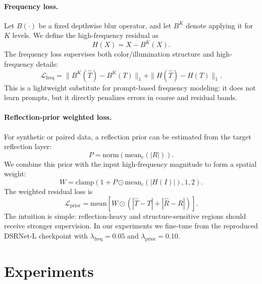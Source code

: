 \documentclass[10pt,twocolumn,letterpaper]{article}
\begin{document}
\paragraph{Frequency loss.}
Let $B(\cdot)$ be a fixed depthwise blur operator, and let $B^K$ denote applying it for $K$ levels.
We define the high-frequency residual as
\begin{equation}
    H(X) = X - B^K(X).
\end{equation}
The frequency loss supervises both color/illumination structure and high-frequency details:
\begin{equation}
    \mathcal{L}_{\mathrm{freq}}
    =
    \|B^K(\hat{T}) - B^K(T)\|_1
    +
    \|H(\hat{T}) - H(T)\|_1 .
    \label{eq:freq_loss}
\end{equation}
This is a lightweight substitute for prompt-based frequency modeling: it does not learn prompts, but it directly penalizes errors in coarse and residual bands.

\paragraph{Reflection-prior weighted loss.}
For synthetic or paired data, a reflection prior can be estimated from the target reflection layer:
\begin{equation}
    P = \mathrm{norm}\left(\mathrm{mean}_c(|R|)\right).
\end{equation}
We combine this prior with the input high-frequency magnitude to form a spatial weight:
\begin{equation}
    W =
    \mathrm{clamp}\left(1 + P \odot \mathrm{mean}_c(|H(I)|), 1, 2\right).
    \label{eq:prior_weight}
\end{equation}
The weighted residual loss is
\begin{equation}
    \mathcal{L}_{\mathrm{prior}}
    =
    \mathrm{mean}\left[
    W \odot
    \left(
    |\hat{T}-T| + |\hat{R}-R|
    \right)
    \right].
    \label{eq:prior_loss}
\end{equation}
The intuition is simple: reflection-heavy and structure-sensitive regions should receive stronger supervision.
In our experiments we fine-tune from the reproduced DSRNet-L checkpoint with $\lambda_{\mathrm{freq}}=0.05$ and $\lambda_{\mathrm{prior}}=0.10$.

\section{Experiments}
\end{document}
